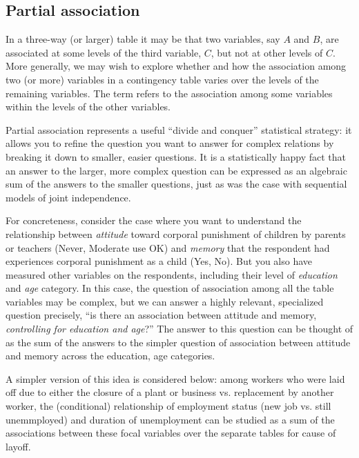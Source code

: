 \documentclass[11pt]{book}\usepackage[]{graphicx}\usepackage[]{color}
\begin{document}

\subsection{Partial association}\label{sec:mospart}

In a three-way (or larger) table it may be that two variables, say $A$ and $B$, are
associated at some levels of the third variable, $C$, but not at other
levels of $C$. More generally, we may wish to explore whether and how the
association among two (or more) variables in a contingency table varies over
the levels of the remaining variables. The term  refers
to the association among some variables within the levels of the other
variables.

Partial association represents a useful ``divide and conquer'' statistical strategy:
it allows you to refine the question you want to answer for complex relations
by breaking it down to smaller, easier questions. It is a statistically
happy fact that an answer to the larger, more complex question 
can be expressed as an algebraic sum of the answers to the smaller questions,
just as was the case with sequential models of joint independence. 

For concreteness, consider the case where you want to understand the
relationship between \emph{attitude} toward corporal punishment of children
by parents or teachers (Never, Moderate use OK) and \emph{memory}
that the respondent had experiences corporal punishment as a child (Yes, No).
But you also have measured other variables on the respondents, including their
level of \emph{education} and \emph{age} category.  In this case, the
question of association among all the table variables may be complex,
but we can answer a highly relevant, specialized question 
precisely, 
``is there an association between attitude and memory,
\emph{controlling for education and age}?''
The answer to this question can be thought of as the sum of the
answers to the simpler question of association between attitude and memory
across the education, age categories.

A simpler version of this idea is considered below:
among workers who were laid off
due to either the closure of a plant or business vs.
replacement by another worker,
the (conditional)
relationship of employment status (new job vs. still unemmployed)
and duration of unemployment can be studied as a sum of the
associations between these focal variables over the separate tables
for cause of layoff.
\end{document}
